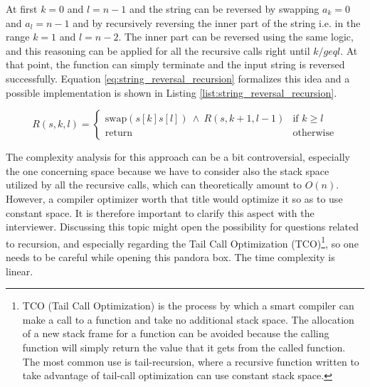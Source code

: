 At first $k=0$ and $l=n-1$ and the string can be reversed by swapping $a_k=0$ and $a_l=n-1$ and
by recursively reversing the inner part of the string i.e. in the range $k=1$ and $l=n-2$.
The inner part can be reversed using the same logic, and this reasoning can be applied for all the recursive calls right until $k /geq l$. At that point, the function can simply terminate and the input string is reversed successfully.
Equation \ref{eq:string_reversal_recursion} formalizes this idea and a possible implementation is shown in Listing \ref{list:string_reversal_recursion}.

\begin{equation}
	R(s, k, l)=
	\begin{cases} 
		\text{swap}(s[k]s[l]) \: \wedge \: R(s,k+1, l-1) & \text{if } k\geq l\\
		\text{return} & \text{otherwise}
	\end{cases}
\label{eq:string_reversal_recursion}
\end{equation} 





The complexity analysis for this approach can be a bit controversial, especially the one concerning space because we have to consider also
the stack space utilized by all the recursive calls, which can theoretically amount to $O(n)$. However, a compiler optimizer worth that title would optimize it so as to use constant space. 
It is therefore important to clarify this aspect with the interviewer.
Discussing this topic might open the possibility for questions related
to recursion, and especially regarding the
Tail Call Optimization (TCO)\footnote{TCO (Tail Call Optimization) is the process by which a smart compiler can make a call to a function and take no additional stack space. The allocation of a new stack frame for a function can be avoided because the calling function will simply return the value that it gets from the called function. The most common use is tail-recursion, where a recursive function written to take advantage of tail-call optimization can	use constant stack space.\nopagebreak}, so one needs to be careful while opening this pandora box.
The time complexity is linear. 
